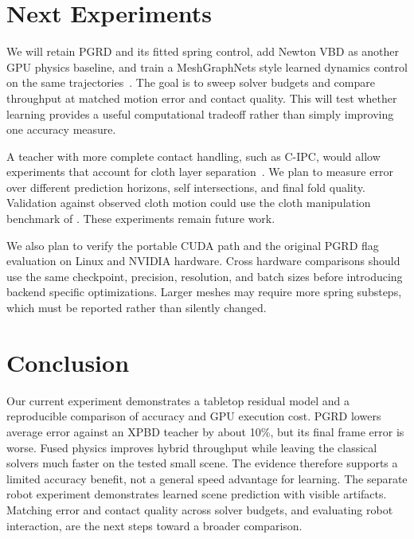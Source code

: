 \documentclass[sigconf]{acmart}
\begin{document}
\section{Next Experiments}
We will retain PGRD and its fitted spring control, add Newton VBD as another GPU physics baseline, and train a MeshGraphNets style learned dynamics control on the same trajectories~\cite{newton,pfaff2021mesh}. The goal is to sweep solver budgets and compare throughput at matched motion error and contact quality. This will test whether learning provides a useful computational tradeoff rather than simply improving one accuracy measure.

A teacher with more complete contact handling, such as C-IPC, would allow experiments that account for cloth layer separation~\cite{cipc}. We plan to measure error over different prediction horizons, self intersections, and final fold quality. Validation against observed cloth motion could use the cloth manipulation benchmark of \citet{blanco2024benchmark}. These experiments remain future work.

We also plan to verify the portable CUDA path and the original PGRD flag evaluation on Linux and NVIDIA hardware. Cross hardware comparisons should use the same checkpoint, precision, resolution, and batch sizes before introducing backend specific optimizations. Larger meshes may require more spring substeps, which must be reported rather than silently changed.

\section{Conclusion}
Our current experiment demonstrates a tabletop residual model and a reproducible comparison of accuracy and GPU execution cost. PGRD lowers average error against an XPBD teacher by about 10\%, but its final frame error is worse. Fused physics improves hybrid throughput while leaving the classical solvers much faster on the tested small scene. The evidence therefore supports a limited accuracy benefit, not a general speed advantage for learning. The separate robot experiment demonstrates learned scene prediction with visible artifacts. Matching error and contact quality across solver budgets, and evaluating robot interaction, are the next steps toward a broader comparison.
\end{document}
